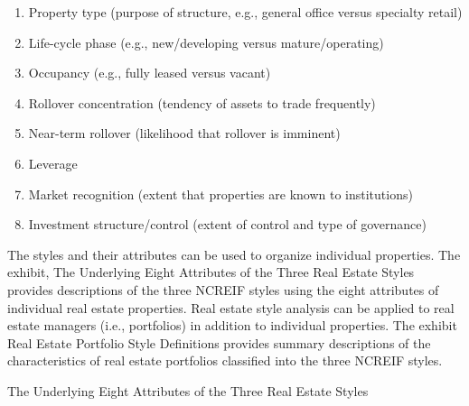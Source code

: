 \documentclass[11pt]{article}
\begin{document}
\begin{enumerate}
  \item Property type (purpose of structure, e.g., general office versus specialty retail)

  \item Life-cycle phase (e.g., new/developing versus mature/operating)

  \item Occupancy (e.g., fully leased versus vacant)

  \item Rollover concentration (tendency of assets to trade frequently)

  \item Near-term rollover (likelihood that rollover is imminent)

  \item Leverage

  \item Market recognition (extent that properties are known to institutions)

  \item Investment structure/control (extent of control and type of governance)

\end{enumerate}

The styles and their attributes can be used to organize individual properties. The exhibit, The Underlying Eight Attributes of the Three Real Estate Styles provides descriptions of the three NCREIF styles using the eight attributes of individual real estate properties. Real estate style analysis can be applied to real estate managers (i.e., portfolios) in addition to individual properties. The exhibit Real Estate Portfolio Style Definitions provides summary descriptions of the characteristics of real estate portfolios classified into the three NCREIF styles.

The Underlying Eight Attributes of the Three Real Estate Styles
\end{document}
